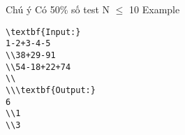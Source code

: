 Chú ý  
Có 50\% số test N  $\le$  10
   Example  
\begin{verbatim}
\textbf{Input:}
1-2+3-4-5
\\38+29-91
\\54-18+22+74
\\
\\\textbf{Output:}
6
\\1
\\3 \end{verbatim}
